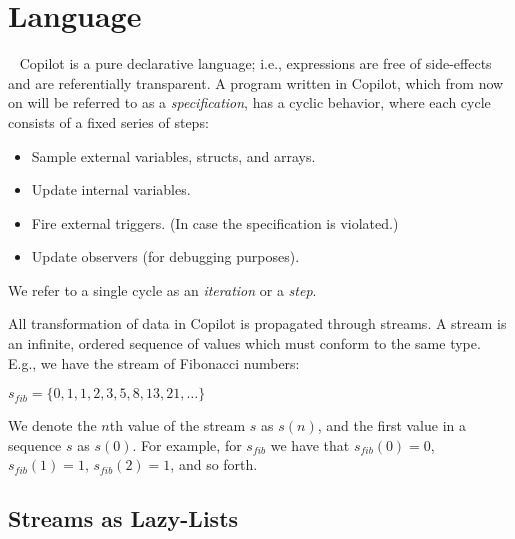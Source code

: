 
\section{Language}~\label{sec:language} Copilot is a pure declarative language;
i.e., expressions are free of side-effects and are referentially transparent.
%
A program written in Copilot, which from now on will be referred to as a
\emph{specification}, has a cyclic behavior, where each cycle consists of a
fixed series of steps:

\begin{itemize}
\item Sample external variables, structs, and arrays.
\item Update internal variables.
\item Fire external triggers. (In case the specification is violated.)
\item Update observers (for debugging purposes).
\end{itemize}

\noindent We refer to a single cycle as an \emph{iteration} or a \emph{step}.

All transformation of data in Copilot is propagated through streams.
%
A stream is an infinite, ordered sequence of values which must conform to the same type.
%
E.g., we have the stream of Fibonacci numbers:

\begin{center}
$s_{fib} = \{0, 1, 1, 2, 3, 5, 8, 13, 21, \dots \}$
\end{center}

\noindent We denote the $n$th value of the stream $s$ as $s(n)$, and the first
value in a sequence $s$ as $s(0)$.
%
For example, for $s_{fib}$ we have that $s_{fib}(0) = 0$,
$s_{fib}(1) = 1$, $s_{fib}(2) = 1$, and so forth.

\subsection{Streams as Lazy-Lists} \label{sec:stream}

